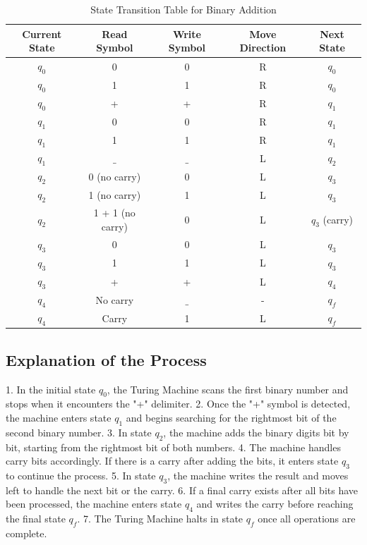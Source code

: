\documentclass[a4paper]{article}
\begin{document}
\begin{table}[h!]
\centering
\begin{tabular}{|c|c|c|c|c|}
    \hline
    \textbf{Current State} & \textbf{Read Symbol} & \textbf{Write Symbol} & \textbf{Move Direction} & \textbf{Next State} \\ \hline
    $q_0$ & 0 & 0 & R & $q_0$ \\ \hline
    $q_0$ & 1 & 1 & R & $q_0$ \\ \hline
    $q_0$ & + & + & R & $q_1$ \\ \hline
    $q_1$ & 0 & 0 & R & $q_1$ \\ \hline
    $q_1$ & 1 & 1 & R & $q_1$ \\ \hline
    $q_1$ & $\_$ & $\_$ & L & $q_2$ \\ \hline
    $q_2$ & 0 (no carry) & 0 & L & $q_3$ \\ \hline
    $q_2$ & 1 (no carry) & 1 & L & $q_3$ \\ \hline
    $q_2$ & 1 + 1 (no carry) & 0 & L & $q_3$ (carry) \\ \hline
    $q_3$ & 0 & 0 & L & $q_3$ \\ \hline
    $q_3$ & 1 & 1 & L & $q_3$ \\ \hline
    $q_3$ & + & + & L & $q_4$ \\ \hline
    $q_4$ & No carry & $\_$ & - & $q_f$ \\ \hline
    $q_4$ & Carry & 1 & L & $q_f$ \\ \hline
\end{tabular}
\caption{State Transition Table for Binary Addition}
\end{table} 

\subsection{Explanation of the Process}

1. In the initial state $q_0$, the Turing Machine scans the first binary number and stops when it encounters the "+" delimiter.
2. Once the "+" symbol is detected, the machine enters state $q_1$ and begins searching for the rightmost bit of the second binary number.
3. In state $q_2$, the machine adds the binary digits bit by bit, starting from the rightmost bit of both numbers.
4. The machine handles carry bits accordingly. If there is a carry after adding the bits, it enters state $q_3$ to continue the process.
5. In state $q_3$, the machine writes the result and moves left to handle the next bit or the carry.
6. If a final carry exists after all bits have been processed, the machine enters state $q_4$ and writes the carry before reaching the final state $q_f$.
7. The Turing Machine halts in state $q_f$ once all operations are complete. 
\end{document}
